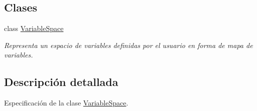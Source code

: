 \subsection*{Clases}
\begin{DoxyCompactItemize}
\item 
class \hyperlink{class_variable_space}{Variable\+Space}
\begin{DoxyCompactList}\small\item\em Representa un espacio de variables definidas por el usuario en forma de mapa de variables. \end{DoxyCompactList}\end{DoxyCompactItemize}


\subsection{Descripción detallada}
Especificación de la clase \hyperlink{class_variable_space}{Variable\+Space}. 

